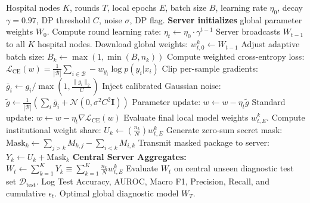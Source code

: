 \documentclass[12pt,a4paper]{report}
\begin{document}
\begin{algorithm}[htbp]
\caption{Privacy-preserving Federated Learning in Healthcare (PPFL)}
\label{alg:main_training}
\begin{algorithmic}[1]
\Require Hospital nodes $K$, rounds $T$, local epochs $E$, batch size $B$, learning rate $\eta_0$, decay $\gamma=0.97$, DP threshold $C$, noise $\sigma$, DP flag.
\State \textbf{Server initializes} global parameter weights $W_0$.
    \State Compute round learning rate: $\eta_t \gets \eta_0 \cdot \gamma^{t-1}$
    \State Server broadcasts $W_{t-1}$ to all $K$ hospital nodes.
        \State Download global weights: $w_{t,0}^k \gets W_{t-1}$
        \State Adjust adaptive batch size: $B_k \gets \max(1, \min(B, n_k))$
                \State Compute weighted cross-entropy loss: $\mathcal{L}_{\text{CE}}(w) = \frac{1}{|\mathcal{B}|}\sum_{i \in \mathcal{B}} -w_{y_i} \log p(y_i|x_i)$
                    \State Clip per-sample gradients: $\bar{g}_i \gets g_i / \max\left(1, \frac{\|g_i\|_2}{C}\right)$
                    \State Inject calibrated Gaussian noise: $\tilde{g} \gets \frac{1}{|\mathcal{B}|}\left( \sum_{i} \bar{g}_i + \mathcal{N}(0, \sigma^2 C^2 \mathbf{I}) \right)$
                    \State Parameter update: $w \gets w - \eta_t \tilde{g}$
                \Else
                    \State Standard update: $w \gets w - \eta_t \nabla \mathcal{L}_{\text{CE}}(w)$
                \EndIf
            \EndFor
        \EndFor
        \State Evaluate final local model weights $w_{t,E}^k$.
        \State Compute institutional weight share: $U_k \gets \left(\frac{n_k}{N}\right) w_{t,E}^k$
        \State Generate zero-sum secret mask: $\text{Mask}_k \gets \sum_{j > k} M_{k,j} - \sum_{i < k} M_{i,k}$
        \State Transmit masked package to server: $Y_k \gets U_k + \text{Mask}_k$
    \EndFor
    \State \textbf{Central Server Aggregates:}
    \State $W_t \gets \sum_{k=1}^K Y_k \equiv \sum_{k=1}^K \frac{n_k}{N} w_{t,E}^k$
    \State Evaluate $W_t$ on central unseen diagnostic test set $\mathcal{D}_{\text{test}}$.
    \State Log Test Accuracy, AUROC, Macro F1, Precision, Recall, and cumulative $\epsilon_t$.
\EndFor
\State \Return Optimal global diagnostic model $W_T$.
\end{algorithmic}
\end{algorithm}
\end{document}
